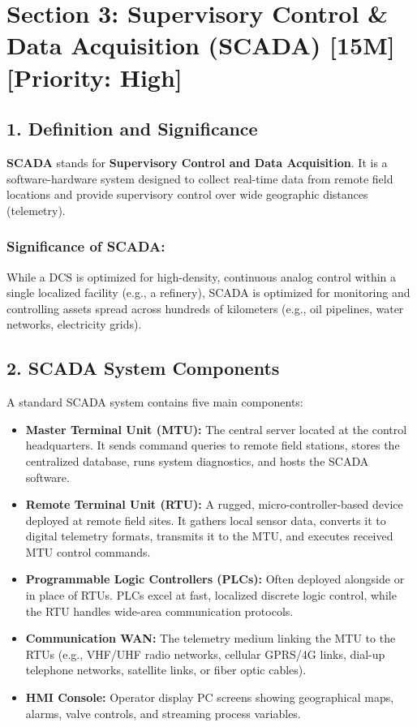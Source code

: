 \section{Section 3: Supervisory Control \& Data Acquisition (SCADA) [15M] [Priority: High]}

\subsection{1. Definition and Significance}
\textbf{SCADA} stands for \textbf{Supervisory Control and Data Acquisition}. It is a software-hardware system designed to collect real-time data from remote field locations and provide supervisory control over wide geographic distances (telemetry).

\subsubsection{Significance of SCADA:}
While a DCS is optimized for high-density, continuous analog control within a single localized facility (e.g., a refinery), SCADA is optimized for monitoring and controlling assets spread across hundreds of kilometers (e.g., oil pipelines, water networks, electricity grids).


\subsection{2. SCADA System Components}
A standard SCADA system contains five main components:

\begin{itemize}
  \item \textbf{Master Terminal Unit (MTU):} The central server located at the control headquarters. It sends command queries to remote field stations, stores the centralized database, runs system diagnostics, and hosts the SCADA software.
  \item \textbf{Remote Terminal Unit (RTU):} A rugged, micro-controller-based device deployed at remote field sites. It gathers local sensor data, converts it to digital telemetry formats, transmits it to the MTU, and executes received MTU control commands.
  \item \textbf{Programmable Logic Controllers (PLCs):} Often deployed alongside or in place of RTUs. PLCs excel at fast, localized discrete logic control, while the RTU handles wide-area communication protocols.
  \item \textbf{Communication WAN:} The telemetry medium linking the MTU to the RTUs (e.g., VHF/UHF radio networks, cellular GPRS/4G links, dial-up telephone networks, satellite links, or fiber optic cables).
  \item \textbf{HMI Console:} Operator display PC screens showing geographical maps, alarms, valve controls, and streaming process variables.
\end{itemize}

